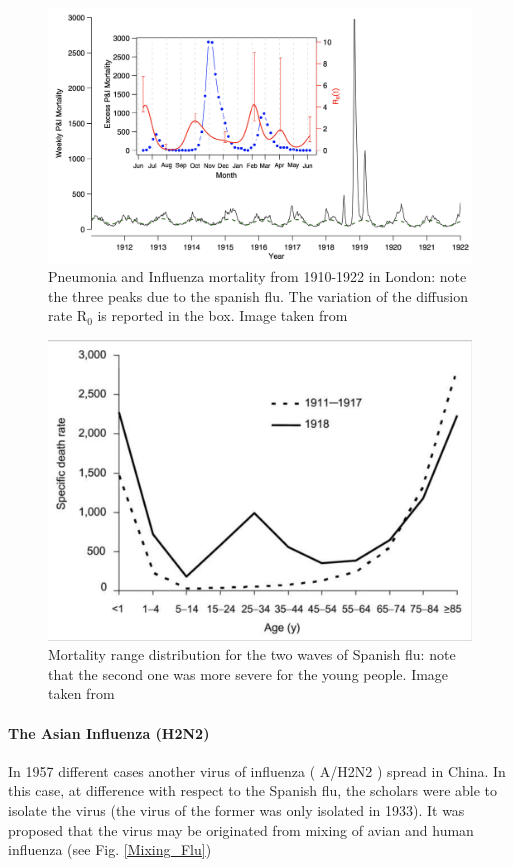 \documentclass[
12pt, %
a4paper, %
oneside, %
headinclude,footinclude, %
BCOR5mm, %
]{scrartcl}
\begin{document}
\begin{figure}[h]
 \centering
 \includegraphics[width=1\linewidth]{Figures/SpanishFLU.png} 
 \caption{Pneumonia and Influenza mortality from 1910-1922 in London: note the three peaks due to the spanish flu. The variation of the diffusion rate R$_{0}$ is reported in the box. Image taken from \cite{he2011mechanistic} }
 \label{SpanishFLU}
\end{figure}

\begin{figure}[h]
 \centering
 \includegraphics[width=0.6\linewidth]{Figures/Mortality_spanish_flu.png} 
 \caption{Mortality range distribution for the two waves of Spanish flu: note that the second one was more severe for the young people. Image taken from \cite{taubenberger20061918}}
 \label{Mortality_spanish_flu}
\end{figure}

\clearpage

\paragraph{The Asian Influenza (H2N2)}

In 1957 different cases another virus of influenza ( A/H2N2 ) spread in China. In this case, at difference with respect to the Spanish flu, the scholars were able to isolate the virus (the virus of the former was only isolated in 1933). It was proposed that the virus may be originated from mixing of avian and human influenza (see Fig. \ref{Mixing_Flu})
\end{document}
